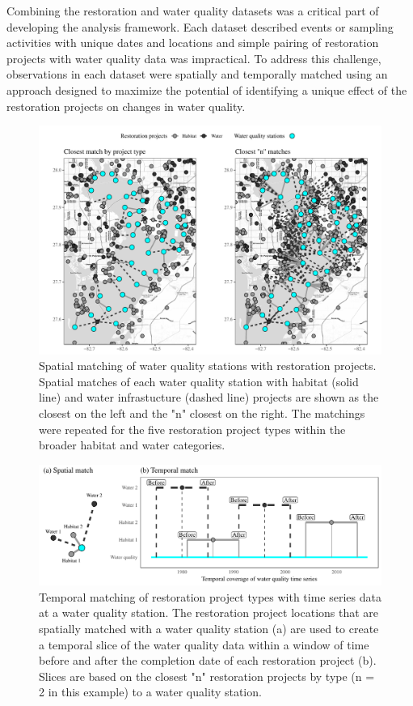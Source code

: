 \documentclass[]{article}
\begin{document}
Combining the restoration and water quality datasets was a critical part
of developing the analysis framework. Each dataset described events or
sampling activities with unique dates and locations and simple pairing
of restoration projects with water quality data was impractical. To
address this challenge, observations in each dataset were spatially and
temporally matched using an approach designed to maximize the potential
of identifying a unique effect of the restoration projects on changes in
water quality.

\begin{figure}
\includegraphics[width=\textwidth]{figs/spmtch} \caption{Spatial matching of water quality stations with restoration projects. Spatial matches of each water quality station with habitat (solid line) and water infrastucture (dashed line) projects are shown as the closest on the left and the "n" closest on the right.  The matchings were repeated for the five restoration project types within the broader habitat and water categories.}\label{fig:spmtch}
\end{figure}

\begin{figure}
\includegraphics[width=\textwidth]{figs/tmmtch} \caption{Temporal matching of restoration project types with time series data at a water quality station.  The restoration project locations that are spatially matched with a water quality station (a) are used to create a temporal slice of the water quality data within a window of time before and after the completion date of each restoration project (b).  Slices are based on the closest "n" restoration projects by type (n = 2 in this example) to a water quality station.}\label{fig:tmmtch}
\end{figure}
\end{document}
